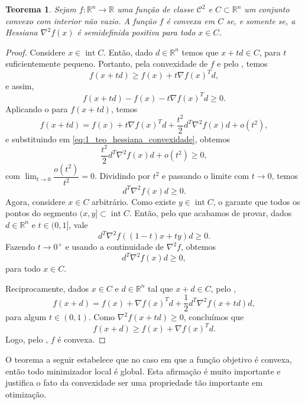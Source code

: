 \documentclass[12pt,a4paper]{scrartcl}
\DeclareMathOperator{\interior}{int}
\def\RR{\mathds{R}}
\newtheorem{teo}{Teorema}
\theoremstyle{definition}%
\begin{document}
\begin{teo} \label{teo:hessiana_convexidade}
Sejam $f:\RR^{n} \rightarrow \RR $ uma função de classe $\mathcal{C}^{2}$ e $C \subset \RR^{n}$ um conjunto convexo com interior não vazio. A função $f$ é convexa em $C$ se, e somente se, a Hessiana $\nabla^{2} f(x)$ é semidefinida positiva para todo $x \in C$.
\end{teo}
\begin{proof}
Considere $x \in \interior C$. Então, dado $d \in \RR^{n}$ temos que $x+td \in C$, para $t$ suficientemente pequeno. Portanto, pela convexidade de $f$ e pelo , temos
\[
f(x+td) \geq f(x) + t\nabla f(x)^{T} d ,
\]
e assim, 
\[ \label{eq:1_teo_hessiana_convexidade}
f(x+td) -f(x) - t\nabla f(x)^{T} d \geq 0 . 
\]
Aplicando o  para $f(x+td)$, temos
\[
f(x+td) = f(x) + t\nabla f(x)^{T}d + \dfrac{t^{2}}{2}d^{T} \nabla^{2} f(x)d + o(t^{2}) ,
\]
e substituindo em \eqref{eq:1_teo_hessiana_convexidade}, obtemos
\[
\dfrac{t^{2}}{2}d^{T} \nabla^{2} f(x)d + o(t^{2}) \geq 0 ,
\]
com $\displaystyle\lim_{t \rightarrow 0} \dfrac{o(t^{2})}{t^{2}} = 0$. 
Dividindo por $t^{2}$ e passando o limite com $t \rightarrow 0$, temos
\[
d^{T} \nabla^{2} f(x)d \geq 0 .
\]
Agora, considere $x \in C$ arbitrário. Como existe $y \in \interior C$, o  garante que todos os pontos do segmento $(x,y] \subset \interior C$. Então, pelo que acabamos de provar, dados $d \in \RR^{n}$ e $t\in (0,1]$, vale
\[
d^{T} \nabla^{2} f((1-t)x+ty)d \geq 0 .
\]
Fazendo $t \rightarrow 0^{+}$ e usando a continuidade de $\nabla^{2} f$, obtemos
\[
d^{T} \nabla^{2} f(x)d \geq 0,
\]
para todo $x \in C$.

Reciprocamente, dados $x \in C$ e $d \in \RR^{n}$ tal que $x+d \in C$, pelo ,
\[
f(x+d) = f(x) + \nabla f(x)^{T}d + \dfrac{1}{2}d^{T} \nabla^{2} f(x+td)d,
\]
para algum $t \in (0,1)$. Como $\nabla ^{2}f(x+td) \geq 0$, concluímos que 
\[
f(x+d) \geq f(x) + \nabla f(x)^{T}d .
\]
Logo, pelo , $f$ é convexa.
\end{proof}

O teorema a seguir estabelece que no caso em que a função objetivo é convexa, então todo minimizador local é global. Esta afirmação é muito importante e justifica o fato da convexidade ser uma propriedade tão importante em otimização.
\end{document}
